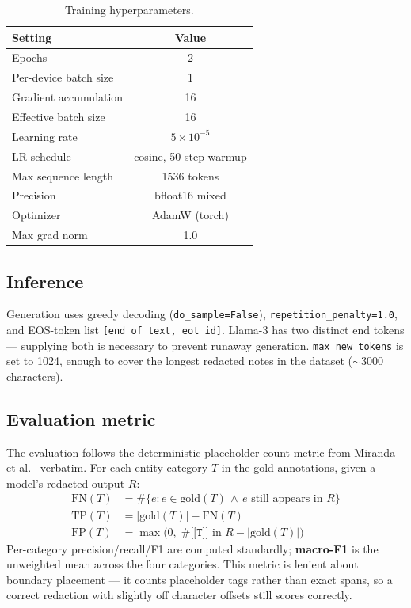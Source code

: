 \documentclass[11pt,a4paper]{article}
\begin{document}
\begin{table}[h]
\centering
\caption{Training hyperparameters.}
\label{tab:hyperparams}
\begin{tabular}{lc}
\toprule
Setting & Value \\
\midrule
Epochs & 2 \\
Per-device batch size & 1 \\
Gradient accumulation & 16 \\
Effective batch size & 16 \\
Learning rate & $5 \times 10^{-5}$ \\
LR schedule & cosine, 50-step warmup \\
Max sequence length & 1536 tokens \\
Precision & bfloat16 mixed \\
Optimizer & AdamW (torch) \\
Max grad norm & 1.0 \\
\bottomrule
\end{tabular}
\end{table}

\subsection{Inference}

Generation uses greedy decoding (\texttt{do\_sample=False}), \texttt{repetition\_penalty=1.0}, and EOS-token list \texttt{[end\_of\_text, eot\_id]}. Llama-3 has two distinct end tokens — supplying both is necessary to prevent runaway generation. \texttt{max\_new\_tokens} is set to 1024, enough to cover the longest redacted notes in the dataset ($\sim$3000 characters).

\subsection{Evaluation metric}

The evaluation follows the deterministic placeholder-count metric from Miranda et al.\ \cite{miranda2025mamma} verbatim. For each entity category $T$ in the gold annotations, given a model's redacted output $R$:
\begin{align*}
\text{FN}(T) &= \#\{e : e \in \text{gold}(T) \,\land\, e \text{ still appears in } R\} \\
\text{TP}(T) &= |\text{gold}(T)| - \text{FN}(T) \\
\text{FP}(T) &= \max\big(0,\; \#\big[\texttt{[T]}\big] \text{ in } R - |\text{gold}(T)|\big)
\end{align*}
Per-category precision/recall/F1 are computed standardly; \textbf{macro-F1} is the unweighted mean across the four categories. This metric is lenient about boundary placement — it counts placeholder tags rather than exact spans, so a correct redaction with slightly off character offsets still scores correctly.
\end{document}
